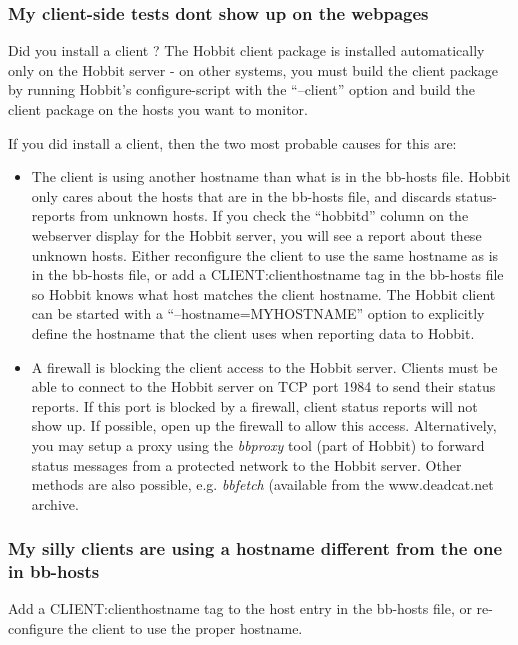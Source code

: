  
\subsubsection{My client-side tests dont show up on the webpages}


 Did you install a client ? The Hobbit client package is installed automatically only on the Hobbit server - on other systems, you must build the client package by running Hobbit's configure-script with the ``--client'' option and build the client package on the hosts you want to monitor.


 If you did install a client, then the two most probable causes for this are:
\begin{itemize}
\item The client is using another hostname than what is in the bb-hosts file. 
 Hobbit only cares about the hosts that are in the bb-hosts file, and discards status-reports from unknown hosts. If you check the ``hobbitd'' column on the webserver display for the Hobbit server, you will see a report about these unknown hosts. 
 Either reconfigure the client to use the same hostname as is in the bb-hosts file, or add a CLIENT:clienthostname tag in the bb-hosts file so Hobbit knows what host matches the client hostname. The Hobbit client can be started with a ``--hostname=MYHOSTNAME'' option to explicitly define the hostname that the client uses when reporting data to Hobbit.
\item A firewall is blocking the client access to the Hobbit server. 
 Clients must be able to connect to the Hobbit server on TCP port 1984 to send their status reports. If this port is blocked by a firewall, client status reports will not show up. 
 If possible, open up the firewall to allow this access. Alternatively, you may setup a proxy using the \emph{bbproxy}
 tool (part of Hobbit) to forward status messages from a protected network to the Hobbit server. 
 Other methods are also possible, e.g. \emph{bbfetch}
 (available from the www.deadcat.net archive. 

\end{itemize}
 
\subsubsection{My silly clients are using a hostname different from the one in bb-hosts}


 Add a CLIENT:clienthostname tag to the host entry in the bb-hosts file, or re-configure the client to use the proper hostname.
 
